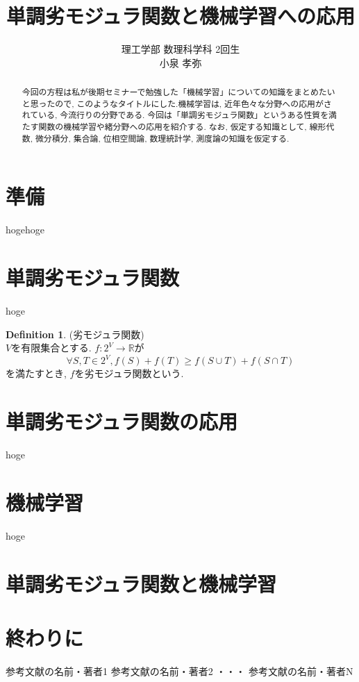 \documentclass[11pt, a4paper, dvipdfmx]{jsarticle}
\title{単調劣モジュラ関数と機械学習への応用}
\author{理工学部  数理科学科  2回生  \\
                 小泉 孝弥}
\date{}
\theoremstyle{definition}
\newtheorem{Definition+}[Axiom+]{Definition}
\begin{document}
\maketitle
\begin{abstract}
今回の方程は私が後期セミナーで勉強した「機械学習」についての知識をまとめたいと思ったので, このようなタイトルにした.機械学習は, 近年色々な分野への応用がされている, 今流行りの分野である. 今回は「単調劣モジュラ関数」というある性質を満たす関数の機械学習や緒分野への応用を紹介する. なお, 仮定する知識として, 線形代数, 微分積分, 集合論, 位相空間論, 数理統計学, 測度論の知識を仮定する.
\end{abstract}
\section{準備}
hogehoge
\section{単調劣モジュラ関数}
hoge
\begin{Definition+}
(劣モジュラ関数)\\
$V$を有限集合とする. $f:2^{V}\to\mathbb{R}$が
\begin{equation*}
\forall S,T\in 2^V, f(S)+f(T) \geq f(S\cup T)+f(S\cap T)
\end{equation*}
を満たすとき, $f$を劣モジュラ関数という.
\end{Definition+}
\section{単調劣モジュラ関数の応用}
hoge
\section{機械学習}
hoge
\section{単調劣モジュラ関数と機械学習}
\section{終わりに}
\begin{thebibliography}{10}
   参考文献の名前・著者1
   参考文献の名前・著者2
  ・・・
   参考文献の名前・著者N
\end{thebibliography}
\end{document}
